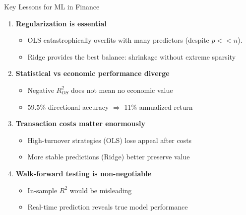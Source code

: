 \documentclass[10pt]{beamer}
\begin{document}
\begin{frame}{Key Lessons for ML in Finance}
  
  \begin{enumerate}
    \item \textbf{Regularization is essential}
    \begin{itemize}
      \item OLS catastrophically overfits with many predictors (despite $p<<n$).
      \item Ridge provides the best balance: shrinkage without extreme sparsity
    \end{itemize}
    
    \vspace{0.5em}
    \item \textbf{Statistical vs economic performance diverge}
    \begin{itemize}
      \item Negative $R^2_{OS}$ does not mean no economic value
      \item 59.5\% directional accuracy $\Rightarrow$ 11\% annualized return
    \end{itemize}
    
    \vspace{0.5em}
    \item \textbf{Transaction costs matter enormously}
    \begin{itemize}
      \item High-turnover strategies (OLS) lose appeal after costs
      \item More stable predictions (Ridge) better preserve value
    \end{itemize}
    
    \vspace{0.5em}
    \item \textbf{Walk-forward testing is non-negotiable}
    \begin{itemize}
      \item In-sample $R^2$ would be misleading
      \item Real-time prediction reveals true model performance
    \end{itemize}
  \end{enumerate}
\end{frame}
\end{document}
